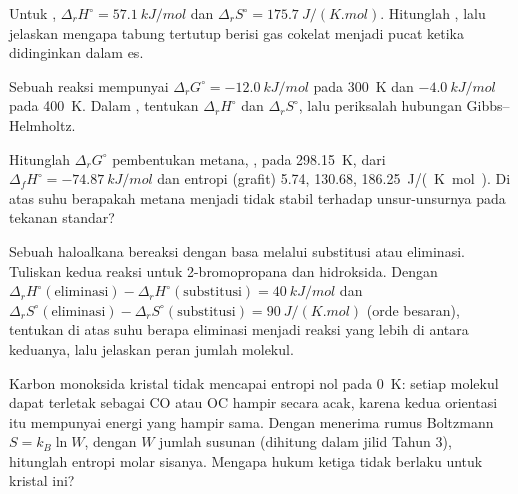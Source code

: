 \begin{exercise}[$\star\star$]\label{exo:b2:reaction-free-energy:6}
Untuk , $\Delta_r H^\circ = \qty{57.1}{kJ/mol}$ dan
$\Delta_r S^\circ = \qty{175.7}{J/(K.mol)}$. Hitunglah ,
lalu jelaskan mengapa tabung tertutup berisi gas cokelat  menjadi
pucat ketika didinginkan dalam es.
\end{exercise}

\begin{exercise}[$\star\star$]\label{exo:b2:reaction-free-energy:7}
Sebuah reaksi mempunyai $\Delta_r G^\circ = \qty{-12.0}{kJ/mol}$ pada
\qty{300}{K} dan $\qty{-4.0}{kJ/mol}$ pada \qty{400}{K}. Dalam , tentukan $\Delta_r H^\circ$ dan $\Delta_r S^\circ$, lalu
periksalah hubungan Gibbs--Helmholtz.
\end{exercise}

\begin{exercise}[$\star\star$]\label{exo:b2:reaction-free-energy:8}
Hitunglah $\Delta_r G^\circ$ pembentukan metana, , pada \qty{298.15}{K}, dari $\Delta_f H^\circ = \qty{-74.87}{kJ/mol}$
dan entropi  (grafit) 5.74,  130.68, 
\qty{186.25}{J/(K.mol)}. Di atas suhu berapakah metana menjadi tidak
stabil terhadap unsur-unsurnya pada tekanan standar?
\end{exercise}

\begin{exercise}[$\star\star$]\label{exo:b2:reaction-free-energy:9}
Sebuah haloalkana bereaksi dengan basa melalui substitusi atau
eliminasi. Tuliskan kedua reaksi untuk 2-bromopropana dan hidroksida.
Dengan $\Delta_r
H^\circ(\text{eliminasi}) - \Delta_r H^\circ(\text{substitusi}) =
\qty{+40}{kJ/mol}$ dan $\Delta_r S^\circ(\text{eliminasi}) - \Delta_r
S^\circ(\text{substitusi}) = \qty{+90}{J/(K.mol)}$ (orde besaran),
tentukan di atas suhu berapa eliminasi menjadi reaksi yang lebih
 di antara keduanya, lalu jelaskan peran jumlah molekul.
\end{exercise}

\begin{exercise}[$\star\star\star$]\label{exo:b2:reaction-free-energy:10}
Karbon monoksida kristal tidak mencapai entropi nol pada \qty{0}{K}:
setiap molekul dapat terletak sebagai CO atau OC hampir secara acak,
karena kedua orientasi itu mempunyai energi yang hampir sama. Dengan
menerima rumus Boltzmann $S = k_B\ln W$, dengan $W$ jumlah susunan
(dihitung dalam jilid Tahun 3), hitunglah entropi molar sisanya. Mengapa
hukum ketiga tidak berlaku untuk kristal ini?
\end{exercise}

